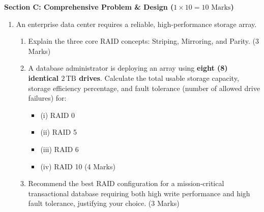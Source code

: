 \begin{chaptertest}
\medskip
\noindent\textbf{Section C: Comprehensive Problem \& Design ($1 \times 10 = 10\text{ Marks}$)}
\begin{enumerate}[leftmargin=1.5em, start=8]
    \item An enterprise data center requires a reliable, high-performance storage array.
    \begin{enumerate}[label=(\alph*)]
        \item Explain the three core RAID concepts: Striping, Mirroring, and Parity. (3 Marks)
        \item A database administrator is deploying an array using \textbf{eight (8) identical $2\,\text{TB}$ drives}. Calculate the total usable storage capacity, storage efficiency percentage, and fault tolerance (number of allowed drive failures) for:
        \begin{itemize}
            \item (i) RAID 0
            \item (ii) RAID 5
            \item (iii) RAID 6
            \item (iv) RAID 10 (4 Marks)
        \end{itemize}
        \item Recommend the best RAID configuration for a mission-critical transactional database requiring both high write performance and high fault tolerance, justifying your choice. (3 Marks)
    \end{enumerate}
\end{enumerate}
\end{chaptertest}

